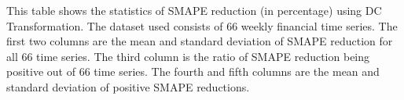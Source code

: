 \begin{center}
    \begin{table}
        \caption{Statistics of SMAPE reduction (\%) using DCT (weekly finance)}
        {\raggedright \footnotesize This table shows the statistics of SMAPE reduction (in percentage) using DC Transformation. The dataset used consists of $66$ weekly financial time series. The first two columns are the mean and standard deviation of SMAPE reduction for all $66$ time series. The third column is the ratio of SMAPE reduction being positive out of $66$ time series. The fourth and fifth columns are the mean and standard deviation of positive SMAPE reductions. \par}
        \label{tbl: weekly smape reduction}
    \end{table}
\end{center}



